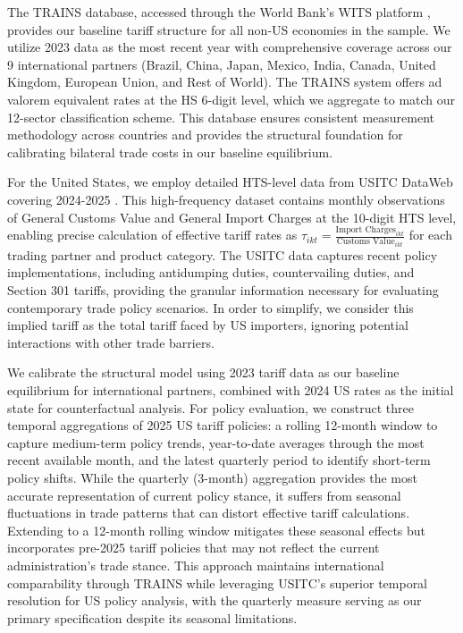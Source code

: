 The TRAINS database, accessed through the World Bank's WITS platform \citep{WITS2025}, provides our baseline tariff structure for all non-US economies in the sample. We utilize 2023 data as the most recent year with comprehensive coverage across our 9 international partners (Brazil, China, Japan, Mexico, India, Canada, United Kingdom, European Union, and Rest of World). The TRAINS system offers ad valorem equivalent rates at the HS 6-digit level, which we aggregate to match our 12-sector classification scheme. This database ensures consistent measurement methodology across countries and provides the structural foundation for calibrating bilateral trade costs in our baseline equilibrium.

For the United States, we employ detailed HTS-level data from USITC DataWeb covering 2024-2025 \citep{USITC2025}. This high-frequency dataset contains monthly observations of General Customs Value and General Import Charges at the 10-digit HTS level, enabling precise calculation of effective tariff rates as $\tau_{ikt} = \frac{\text{Import Charges}_{ikt}}{\text{Customs Value}_{ikt}}$ for each trading partner and product category. The USITC data captures recent policy implementations, including antidumping duties, countervailing duties, and Section 301 tariffs, providing the granular information necessary for evaluating contemporary trade policy scenarios. In order to simplify, we consider this implied tariff as the total tariff faced by US importers, ignoring potential interactions with other trade barriers.

We calibrate the structural model using 2023 tariff data as our baseline equilibrium for international partners, combined with 2024 US rates as the initial state for counterfactual analysis. For policy evaluation, we construct three temporal aggregations of 2025 US tariff policies: a rolling 12-month window to capture medium-term policy trends, year-to-date averages through the most recent available month, and the latest quarterly period to identify short-term policy shifts. While the quarterly (3-month) aggregation provides the most accurate representation of current policy stance, it suffers from seasonal fluctuations in trade patterns that can distort effective tariff calculations. Extending to a 12-month rolling window mitigates these seasonal effects but incorporates pre-2025 tariff policies that may not reflect the current administration's trade stance. This approach maintains international comparability through TRAINS while leveraging USITC's superior temporal resolution for US policy analysis, with the quarterly measure serving as our primary specification despite its seasonal limitations.
